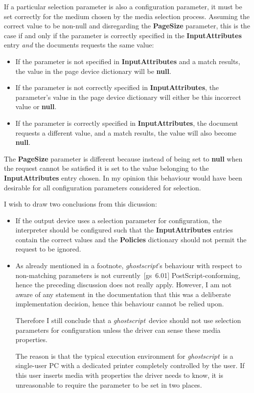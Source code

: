 \documentclass[twoside,a4paper]{article}
\newcommand{\gs}{\textit{ghostscript\/}}
\newcommand{\ps}[1]{{\sffamily\bfseries #1}}	%
\begin{document}
If a particular selection parameter is also a configuration parameter,
it must be set correctly for the medium chosen by the media selection process.
Assuming the correct value to be non-null and disregarding the
\ps{PageSize} parameter,
this is the case if and only if the parameter is correctly specified in the
\ps{InputAttributes} entry \emph{and\/} the documents requests the same value:
\begin{itemize}
  \item
    If the parameter is not specified in \ps{InputAttributes} and a match
    results, the value in the page device dictionary will be \ps{null}.
  \item
    If the parameter is not correctly specified in \ps{InputAttributes},
    the parameter's value in the page device dictionary will either be this
    incorrect value or \ps{null}.
  \item
    If the parameter is correctly specified in \ps{InputAttributes},
    the document requests a different value,
    and a match results,
    the value will also become \ps{null}.
\end{itemize}
The \ps{PageSize} parameter is different because instead of being set to
\ps{null} when the request cannot be satisfied it is set to the value
belonging to the \ps{InputAttributes} entry chosen.
In my opinion this behaviour would have been desirable for all
configuration parameters considered for selection.

I wish to draw two conclusions from this dicussion:
\begin{itemize}
  \item
    If the output device uses a selection parameter for configuration,
    the interpreter should be configured such that the \ps{InputAttributes}
    entries contain the correct values
    and the \ps{Policies} dictionary should not permit the request to be
    ignored.
  \item
    As already mentioned in a footnote,
    \gs's behaviour with respect to non-matching parameters is not
    currently~[gs~6.01] PostScript-conforming,
    hence the preceding discussion does not really apply.
    However, I am not aware of any statement in the documentation that this
    was a deliberate implementation decision,
    hence this behaviour cannot be relied upon.

    Therefore I still conclude that
    a \gs\ device should not use selection parameters for configuration
    unless the driver can sense these media properties.

    The reason is that the typical execution environment for \gs\ is a
    single-user PC with a dedicated printer completely controlled by the user.
    If this user inserts media with properties the driver needs to know,
    it is unreasonable to require the parameter to be set in two places.
\end{itemize}
\end{document}
